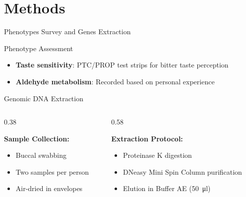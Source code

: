 \documentclass[10pt,hyperref={colorlinks,citecolor=blue,urlcolor=peking_blue,linkcolor=}]{beamer}
\theoremstyle{plain}
\begin{document}
\section{Methods}

\begin{frame}{Phenotypes Survey and Genes Extraction}
    \begin{block}{Phenotype Assessment}
        \begin{itemize}
            \item \textbf{Taste sensitivity}: PTC/PROP test strips for bitter taste perception
            \item \textbf{Aldehyde metabolism}: Recorded based on personal experience
        \end{itemize}
    \end{block}

    \begin{block}{Genomic DNA Extraction}
        \begin{columns}
            \hspace{1em} %
            \begin{column}{0.38\textwidth} %
                
                \textbf{Sample Collection:}
                \begin{itemize}
                    \item Buccal swabbing
                    \item Two samples per person
                    \item Air-dried in envelopes
                \end{itemize}
            \end{column}

            \hspace{-2em}
            
            \begin{column}{0.58\textwidth}
                
                \textbf{Extraction Protocol:}
                \begin{itemize}
                    \item Proteinase K digestion
                    \item DNeasy Mini Spin Column purification
                    \item Elution in Buffer AE (\qty{50}{\ul})
                \end{itemize}
            \end{column}
        \end{columns}
    \end{block}


\end{frame}
\end{document}

